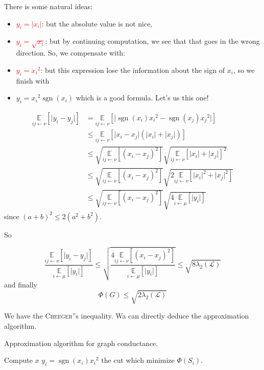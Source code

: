 \documentclass[12pt]{article}
\newcommand{\EE}{\mathbb{E}}
\renewcommand{\L}{\mathcal{L}}
\newcommand{\la}{\leftarrow}
\newcommand{\esp}[2][]{\underset{#1}{\EE}\left[ #2 \right]}
\DeclareMathOperator{\sgn}{sgn}
\begin{document}
There is some natural ideas:
\begin{itemize}
    \item \textcolor{red}{$y_i = \lvert x_i \rvert$}: but the absolute value is not nice, 
    \item \textcolor{red}{$y_i = \sqrt{x_i}$}: but by continuing computation, we see that that goes in the wrong direction. So, we compensate with:
    \item \textcolor{red}{$y_i = {x_i}^2$}: but this expression lose the information about the sign of $x_i$, so we finish with
    \item \textcolor{green!50!black}{$y_i = {x_i}^2 \sgn(x_i)$} which is a good formula. Let's us this one!
\end{itemize}

\[
    \begin{aligned}
        \esp[ij\la\nu]{\lvert y_i - y_j \rvert} &= \esp[ij \la \nu]{\lvert \sgn(x_i){x_i}^2 - \sgn(x_j){x_j}^2\rvert}\\
        &\leqslant \esp[ij\la \nu]{\lvert x_i-x_j \rvert(\lvert x_i \rvert + \lvert x_j \rvert)}\\
        &\leqslant \sqrt{\esp[ij\la\nu]{(x_i-x_j)^2}} \sqrt{\esp[ij\la \nu]{\lvert x_i \rvert + \lvert x_j \rvert}^2}\\
        &\leqslant \sqrt{\esp[ij\la\nu]{(x_i-x_j)^2}} \sqrt{2\esp[ij\la \nu]{\lvert x_i \rvert^2 + \lvert x_j \rvert^2}}\\
        &\leqslant \sqrt{\esp[ij\la\nu]{(x_i-x_j)^2}} \sqrt{4\esp[i\la \mu]{\lvert y_i \rvert}}
    \end{aligned}
\]
since $(a+b)^2 \leqslant 2(a^2+b^2)$.


So

\[
    \frac{\esp[ij\la\nu]{\lvert y_i-y_j \rvert}}{\esp[i\la\mu]{\lvert y_i \rvert}} \leqslant \sqrt{\frac{4 \esp[ij\la\nu]{(x_i-x_j)^2}}{\esp[i\la\mu]{\lvert y_i \rvert}}} \leqslant\sqrt{8\lambda_2(\L)}
\]
and finally 
\[
    \Phi(G) \leqslant \sqrt{2\lambda_2(\L)}
\]

We have the \textsc{Cheeger}''s inequality. Wa can directly deduce the approximation algorithm.

\begin{algorithm}[!ht]
    \caption{Approximation algorithm for graph conductance.}
    \DontPrintSemicolon
    Compute $x$\;
    $y_i = \sgn(x_i){x_i}^2$\;
    \Return the cut which minimize $\Phi(S_i)$.
\end{algorithm}



\end{document}
